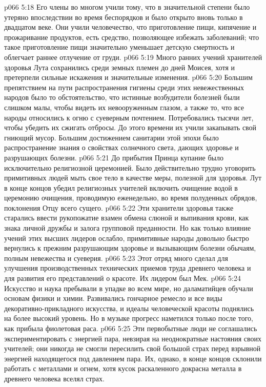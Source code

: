 \vs p066 5:18 Его члены во многом учили тому, что в значительной степени было утеряно впоследствии во время беспорядков и было открыто вновь только в двадцатом веке. Они учили человечество, что приготовление пищи, кипячение и прожаривание продуктов, есть средство, позволяющее избежать заболеваний; что такое приготовление пищи значительно уменьшает детскую смертность и облегчает раннее отлучение от груди.
\vs p066 5:19 Много ранних учений хранителей здоровья Лута сохранились среди земных племен до дней Моисея, хотя и претерпели сильные искажения и значительные изменения.
\vs p066 5:20 Большим препятствием на пути распространения гигиены среди этих невежественных народов было то обстоятельство, что истинные возбудители болезней были слишком малы, чтобы видеть их невооруженным глазом, а также то, что все народы относились к огню с суеверным почтением. Потребовались тысячи лет, чтобы убедить их сжигать отбросы. До этого времени их учили закапывать свой гниющий мусор. Большим достижением санитарии этой эпохи было распространение знания о свойствах солнечного света, дающих здоровье и разрушающих болезни.
\vs p066 5:21 До прибытия Принца купание было исключительно религиозной церемонией. Было действительно трудно уговорить примитивных людей мыть свое тело в качестве меры, полезной для здоровья. Лут в конце концов убедил религиозных учителей включить очищение водой в церемонию очищения, проводимую еженедельно, во время полуденных обрядов, поклонения Отцу всего сущего.
\vs p066 5:22 Эти хранители здоровья также старались ввести рукопожатие взамен обмена слюной и выпивания крови, как знака личной дружбы и залога групповой преданности. Но как только влияние учений этих высших лидеров ослабло, примитивные народы довольно быстро вернулись к прежним разрушающим здоровье и вызывающим болезни обычаям, полным невежества и суеверия.
\vs p066 5:23 \pc {}\bibnobreakspace {} Этот отряд много сделал для улучшения производственных технических приемов труда древнего человека и для развития его представлений о красоте. Их лидером был Мек.
\vs p066 5:24 Искусство и наука пребывали в упадке во всем мире, но даламатийцев обучали основам физики и химии. Развивались гончарное ремесло и все виды декоративно\hyp{}прикладного искусства, и идеалы человеческой красоты поднялись на более высокий уровень. Но в музыке прогресс наметился только после того, как прибыла фиолетовая раса.
\vs p066 5:25 Эти первобытные люди не соглашались экспериментировать с энергией пара, невзирая на неоднократные настояния своих учителей; они никогда не смогли пересилить свой большой страх перед взрывной энергией находящегося под давлением пара. Их, однако, в конце концов склонили работать с металлами и огнем, хотя кусок раскаленного докрасна металла в древнего человека вселял страх.

